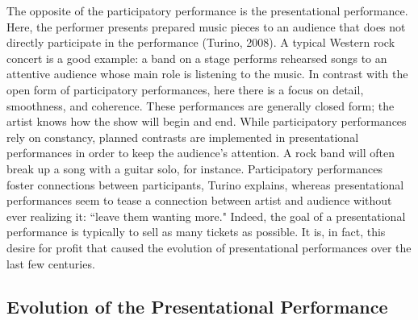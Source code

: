 The opposite of the participatory performance is the presentational performance. Here, the performer presents prepared music pieces to an audience that does not directly participate in the performance (Turino, 2008). A typical Western rock concert is a good example: a band on a stage performs rehearsed songs to an attentive audience whose main role is listening to the music. In contrast with the open form of participatory performances, here there is a focus on detail, smoothness, and coherence. These performances are generally closed form; the artist knows how the show will begin and end. While participatory performances rely on constancy, planned contrasts are implemented in presentational performances in order to keep the audience's attention. A rock band will often break up a song with a guitar solo, for instance. Participatory performances foster connections between participants, Turino explains, whereas presentational performances seem to tease a connection between artist and audience without ever realizing it: ``leave them wanting more." Indeed, the goal of a presentational performance is typically to sell as many tickets as possible. It is, in fact, this desire for profit that caused the evolution of presentational performances over the last few centuries.

\subsection{Evolution of the Presentational Performance}

